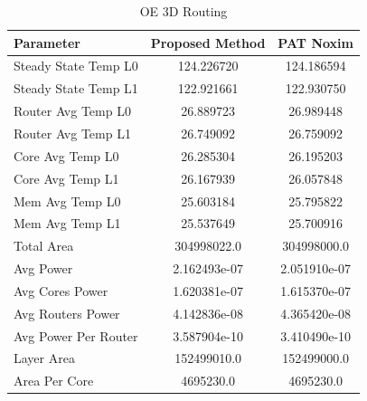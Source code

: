 \documentclass[conference]{IEEEtran}
\begin{document}
	\begin{table}[h!]
		\centering
		\begin{tabular}{|l|c|c|}
			\hline
			\textbf{Parameter} & \textbf{Proposed Method} & \textbf{PAT Noxim} \\ \hline
			Steady State Temp L0 & 124.226720 & 124.186594 \\ \hline
			Steady State Temp L1 & 122.921661 & 122.930750 \\ \hline
			Router Avg Temp L0 & 26.889723 & 26.989448 \\ \hline
			Router Avg Temp L1 & 26.749092 & 26.759092 \\ \hline
			Core Avg Temp L0 &26.285304 & 26.195203 \\ \hline
			Core Avg Temp L1 & 26.167939 & 26.057848 \\ \hline
			Mem Avg Temp L0 & 25.603184 & 25.795822 \\ \hline
			Mem Avg Temp L1 & 25.537649 & 25.700916 \\ \hline
			Total Area & 304998022.0 & 304998000.0 \\ \hline
			Avg Power & 2.162493e-07 & 2.051910e-07 \\ \hline
			Avg Cores Power & 1.620381e-07 & 1.615370e-07 \\ \hline
			Avg Routers Power & 4.142836e-08 & 4.365420e-08 \\ \hline
			Avg Power Per Router & 3.587904e-10 & 3.410490e-10 \\ \hline
			Layer Area & 152499010.0 & 152499000.0 \\ \hline
			Area Per Core & 4695230.0 & 4695230.0 \\ \hline
		\end{tabular}
		\caption{OE 3D Routing}
		\label{table:oe_3d_routing}
	\end{table}
	
\end{document}
